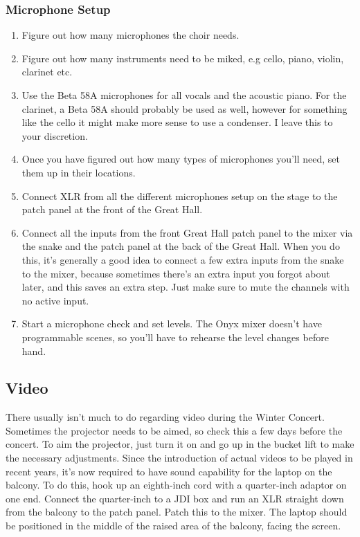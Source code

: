 \documentclass[letterpaper,10pt,oneside,headsepline]{scrreprt}
\begin{document}
\subsubsection{Microphone Setup}

\begin{enumerate}
\item Figure out how many microphones the choir needs.
\item Figure out how many instruments need to be miked, e.g cello, piano, violin, clarinet etc.
\item Use the Beta 58A microphones for all vocals and the acoustic piano. For the clarinet, a Beta 58A should probably be used as well, however for something like the cello it might make more sense to use a condenser. I leave this to your discretion.
\item Once you have figured out how many types of microphones you'll need, set them up in their locations.
\item Connect XLR from all the different microphones setup on the stage to the patch panel at the front of the Great Hall.
\item Connect all the inputs from the front Great Hall patch panel to the mixer via the snake and the patch panel at the back of the Great Hall. When you do this, it's generally a good idea to connect a few extra inputs from the snake to the mixer, because sometimes there's an extra input you forgot about later, and this saves an extra step. Just make sure to mute the channels with no active input.
\item Start a microphone check and set levels. The Onyx mixer doesn't have programmable scenes, so you'll have to rehearse the level changes before hand.
\end{enumerate}

\subsection{Video}
There usually isn't much to do regarding video during the Winter Concert. Sometimes the projector needs to be aimed, so check this a few days before the concert. To aim the projector, just turn it on and go up in the bucket lift to make the necessary adjustments. Since the introduction of actual videos to be played in recent years, it's now required to have sound capability for the laptop on the balcony. To do this, hook up an eighth-inch cord with a quarter-inch adaptor on one end. Connect the quarter-inch to a JDI box and run an XLR straight down from the balcony to the patch panel. Patch this to the mixer. The laptop should be positioned in the middle of the raised area of the balcony, facing the screen.
\end{document}
